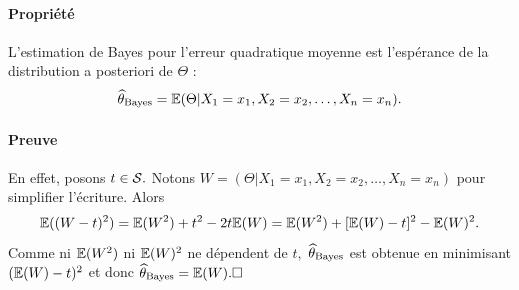 \paragraph{Propriété} L'estimation de Bayes pour l'erreur quadratique moyenne
est l'espérance de la distribution a posteriori de $\Theta$ : 
\begin{equation}
  \label{eq:bayes_estimator2}
  \widehat{\theta}_{\text{Bayes}}  = \mathbb{E}(\Theta|X_1 = x_1, X_2=x_2, \dots, X_n=x_n).
\end{equation}

\paragraph{Preuve}
En effet, posons $t \in \mathcal{S}.$ Notons
$W = (\Theta|X_1=x_1, X_2=x_2, \dots, X_n=x_n)$ pour simplifier l'écriture.
Alors
\begin{equation*}
  \mathbb{E}((W - t)^2) =  \mathbb{E}(W^2) + t^2 - 2 t \mathbb{E}(W) =  \mathbb{E}(W^2) + [\mathbb{E}(W) - t]^2 - \mathbb{E}(W)^2.  
\end{equation*}
Comme ni $\mathbb{E}(W^2)$ ni $\mathbb{E}(W)^2$ ne dépendent de $t,$
$\widehat{\theta}_{\text{Bayes}}$ est obtenue en minimisant $(\mathbb{E}(W) - t)^2$ et donc $\hatbys{\theta} = 
\EE(W). \hfill \square$

